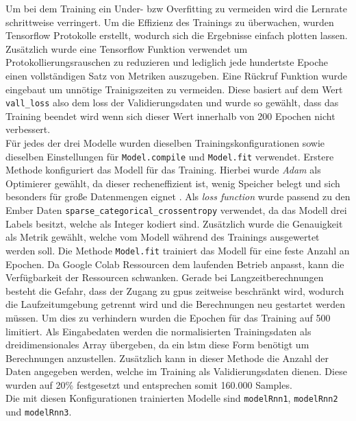 \documentclass[
    12pt, %
    DIV10,
    ngerman, %
    a4paper, %
    oneside, %
    titlepage, %
    parskip=half, %
    headings=normal, %
    listof=totoc, %
    bibliography=totoc, %
    index=totoc, %
    captions=tableheading, %
    final %
]{scrreprt}
\begin{document}
Um bei dem Training ein Under- bzw Overfitting zu vermeiden wird die Lernrate schrittweise verringert. Um die Effizienz des Trainings zu überwachen, wurden Tensorflow Protokolle erstellt, wodurch sich die Ergebnisse einfach plotten lassen. Zusätzlich wurde eine Tensorflow Funktion verwendet um Protokollierungsrauschen zu reduzieren und lediglich jede hundertste Epoche einen vollständigen Satz von Metriken auszugeben. Eine Rückruf Funktion wurde eingebaut um unnötige Trainigszeiten zu vermeiden. Diese basiert auf dem Wert \texttt{vall\_loss} also dem loss der Validierungsdaten und wurde so gewählt, dass das Training beendet wird wenn sich dieser Wert innerhalb von 200 Epochen nicht verbessert.\\ Für jedes der drei Modelle wurden dieselben Trainingskonfigurationen sowie dieselben Einstellungen für \texttt{Model.compile} und \texttt{Model.fit} verwendet.
Erstere Methode konfiguriert das Modell für das Training. Hierbei wurde \emph{Adam} als Optimierer gewählt, da dieser recheneffizient ist, wenig Speicher belegt und sich besonders für gro{\ss}e Datenmengen eignet \parencite{Kingma2015}. Als \emph{loss function} wurde passend zu den Ember Daten \texttt{sparse\_categorical\_crossentropy} verwendet, da das Modell drei Labels besitzt, welche als Integer kodiert sind. Zusätzlich wurde die Genauigkeit als Metrik gewählt, welche vom Modell während des Trainings ausgewertet werden soll. Die Methode \texttt{Model.fit} trainiert das Modell für eine feste Anzahl an Epochen. Da Google Colab Ressourcen dem laufenden Betrieb anpasst, kann die Verfügbarkeit der Ressourcen schwanken. Gerade bei Langzeitberechnungen besteht die Gefahr, dass der Zugang zu \acs{gpus} zeitweise beschränkt wird, wodurch die Laufzeitumgebung getrennt wird und die Berechnungen neu gestartet werden müssen. Um dies zu verhindern wurden die Epochen für das Training auf 500 limitiert. Als Eingabedaten werden die normalisierten Trainingsdaten als dreidimensionales Array übergeben, da ein \ac{lstm} diese Form benötigt um Berechnungen anzustellen. Zusätzlich kann in dieser Methode die Anzahl der Daten angegeben werden, welche im Training als Validierungsdaten dienen. Diese wurden auf 20\% festgesetzt und entsprechen somit 160.000 Samples.\\
Die mit diesen Konfigurationen trainierten Modelle sind \texttt{modelRnn1}, \texttt{modelRnn2} und \texttt{modelRnn3}.\\
\end{document}
